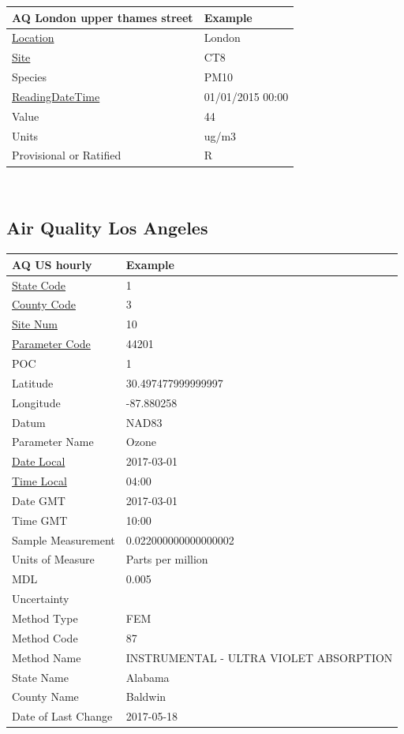 \documentclass{article}
\begin{document}
\begin{tabular}{ |p{8cm}| p{5cm}|  }
\hline
 AQ London upper thames street & Example\\
 \hline
 \uline{Location} & London\\
 \uline{Site} & CT8 \\
Species &PM10\\
 \uline{ReadingDateTime} & 01/01/2015 00:00\\
 Value & 44 \\
Units & ug/m3\\
Provisional or Ratified & R\\
 \hline
\end{tabular}\\




\subsection{Air Quality Los Angeles}


\begin{tabular}{ |p{8cm}| p{5cm}|  }
\hline
 AQ US hourly & Example\\
 \hline
 \uline{State Code} & 1\\
 \uline{County Code} & 3\\
\uline{Site Num}&  10\\
 \uline{Parameter Code}& 44201\\
 POC& 1\\
Latitude& 30.497477999999997\\
Longitude& -87.880258\\
 Datum& NAD83\\
 Parameter Name& Ozone\\
\uline{Date Local}& 2017-03-01 \\
\uline{Time Local}& 04:00\\
 Date GMT& 2017-03-01\\
 Time GMT& 10:00\\
Sample Measurement& 0.022000000000000002\\
Units of Measure& Parts per million\\
MDL& 0.005\\
Uncertainty&  \\
 Method Type& FEM\\
Method Code& 87\\
Method Name& INSTRUMENTAL - ULTRA VIOLET ABSORPTION\\
State Name& Alabama \\
County Name& Baldwin\\
Date of Last Change& 2017-05-18\\
 \hline
\end{tabular}\\
\end{document}
